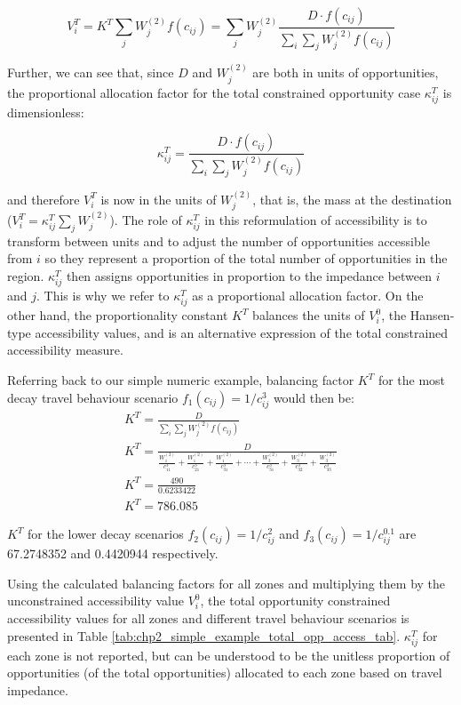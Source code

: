 \documentclass[
11pt, %
oneside, %
english, %
singlespacing, %
]{macthesis} %
\begin{document}
\[
V^T_i = K^T\sum_j W^{(2)}_jf(c_{ij}) = \sum_j W^{(2)}_j\frac{D\cdot f(c_{ij})}{\sum_i\sum_j W^{(2)}_jf(c_{ij})}
\]

Further, we can see that, since \(D\) and \(W^{(2)}_j\) are both in units of opportunities, the proportional allocation factor for the total constrained opportunity case \(\kappa_{ij}^T\) is dimensionless:

\[
\kappa_{ij}^T = \frac{D\cdot f(c_{ij})}{\sum_i\sum_j W^{(2)}_jf(c_{ij})}
\]

\noindent and therefore \(V^T_i\) is now in the units of \(W^{(2)}_j\), that is, the mass at the destination (\(V^T_i = \kappa_{ij}^T\sum_j W^{(2)}_j\)). The role of \(\kappa_{ij}^T\) in this reformulation of accessibility is to transform between units and to adjust the number of opportunities accessible from \(i\) so they represent a proportion of the total number of opportunities in the region. \(\kappa_{ij}^T\) then assigns opportunities in proportion to the impedance between \(i\) and \(j\). This is why we refer to \(\kappa_{ij}^T\) as a proportional allocation factor. On the other hand, the proportionality constant \(K^T\) balances the units of \(V^0_i\), the Hansen-type accessibility values, and is an alternative expression of the total constrained accessibility measure.

Referring back to our simple numeric example, balancing factor \(K^T\) for the most decay travel behaviour scenario \(f_1(c_{ij}) = 1/c_{ij}^3\) would then be:
\[
\begin{array}{l}
K^T = \frac{D}{\sum_{i}\sum_{j} W_j^{(2)} f(c_{ij})}\\
K^T = \frac{D}{\frac{W_1^{(2)}}{c_{11}^3}+\frac{W_1^{(2)}}{c_{21}^3} + \frac{W_1^{(2)}}{c_{31}^3} + \cdots + \frac{W_3^{(2)}}{c_{31}^3} + \frac{W_3^{(2)}}{c_{32}^3} + \frac{W_3^{(2)}}{c_{33}^3}
}\\
K^T = \frac{490}{0.6233422} \\
K^T = 786.085
\end{array}
\]

\(K^T\) for the lower decay scenarios \(f_2(c_{ij}) = 1/c_{ij}^2\) and \(f_3(c_{ij}) = 1/c_{ij}^0.1\) are 67.2748352 and 0.4420944 respectively.

Using the calculated balancing factors for all zones and multiplying them by the unconstrained accessibility value \(V^0_i\), the total opportunity constrained accessibility values for all zones and different travel behaviour scenarios is presented in Table \ref{tab:chp2_simple_example_total_opp_access_tab}. \(\kappa_{ij}^T\) for each zone is not reported, but can be understood to be the unitless proportion of opportunities (of the total opportunities) allocated to each zone based on travel impedance.
\end{document}
